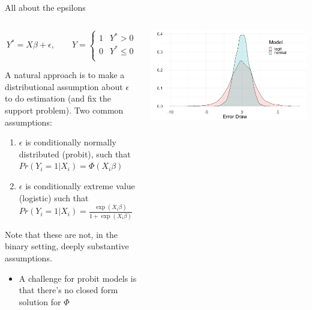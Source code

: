\documentclass[notes,11pt, aspectratio=169]{beamer}
\newenvironment{wideitemize}{\itemize\addtolength{\itemsep}{10pt}}{\enditemize}
\begin{document}
\begin{frame}{All about the epsilons}
  \begin{columns}[T] %
    \begin{column}{.6\textwidth}
  $$Y^{*} = X\beta + \epsilon, \qquad Y = 
  \begin{cases}
    1 & Y^{*}>0\\
    0 & Y^{*} \leq 0\\
  \end{cases}
  $$
      \begin{wideitemize}
      \item A natural approach is to make a distributional assumption
        about $\epsilon$ to do estimation (and fix the support
        problem). Two common assumptions:
        \begin{enumerate}
        \item $\epsilon$ is conditionally normally distributed (probit), such that
          $Pr(Y_{i} = 1 | X_{i}) = \Phi(X_{i}\beta)$
        \item $\epsilon$ is conditionally extreme value (logistic) such that
          $Pr(Y_{i} = 1 | X_{i}) = \frac{\exp(X_{i}\beta)}{1+\exp(X_{i}\beta)}$
        \end{enumerate}
      \item   Note that these are not, in the binary setting, deeply substantive
        assumptions.
        \begin{itemize}
        \item A challenge for probit models is that there's no closed
          form solution for $\Phi$
        \end{itemize}
      \end{wideitemize}
    \end{column}%
  \hfill%
  \begin{column}{.4\textwidth}
    \begin{center}
      \includegraphics[width=\linewidth]{images/logit_v_normal.png}
    \end{center}
  \end{column}
\end{columns}
  \end{frame}
\end{document}
